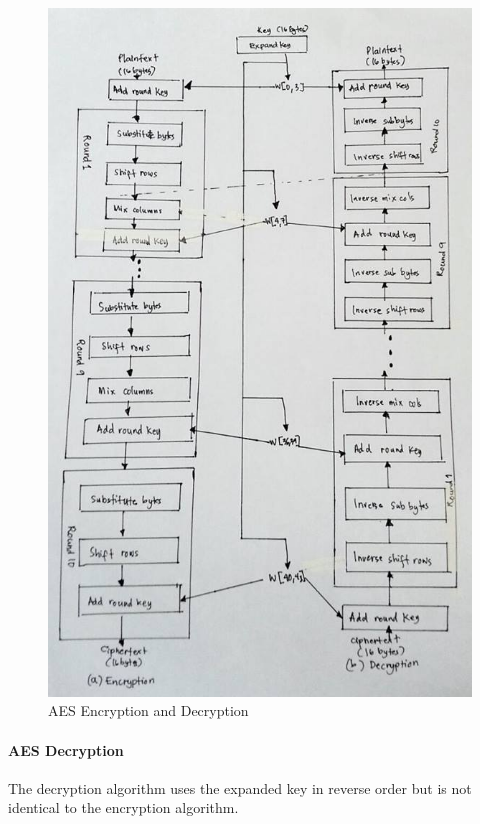 \documentclass{article}
\begin{document}
\begin{figure}[h]
\begin{center}
\includegraphics[scale=.4]{AESEncryptionAndDecryption2.jpg}
\caption{AES Encryption and Decryption}
\label{AESEncryptionAndDecryption}
\end{center}
\end{figure}

\paragraph{AES Decryption}
The decryption algorithm uses the expanded key in reverse order but is not identical to the encryption algorithm. \cite{stallings2011}
\end{document}

